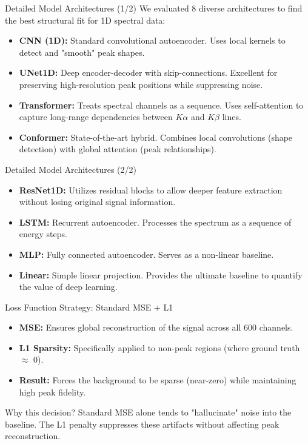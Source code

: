 \begin{frame}{Detailed Model Architectures (1/2)}
    We evaluated 8 diverse architectures to find the best structural fit for 1D spectral data:
    \vspace{0.2cm}
    \begin{itemize}
        \item \textbf{CNN (1D):} Standard convolutional autoencoder. Uses local kernels to detect and "smooth" peak shapes.
        \item \textbf{UNet1D:} Deep encoder-decoder with skip-connections. Excellent for preserving high-resolution peak positions while suppressing noise.
        \item \textbf{Transformer:} Treats spectral channels as a sequence. Uses self-attention to capture long-range dependencies between $K\alpha$ and $K\beta$ lines.
        \item \textbf{Conformer:} State-of-the-art hybrid. Combines local convolutions (shape detection) with global attention (peak relationships).
    \end{itemize}
\end{frame}

\begin{frame}{Detailed Model Architectures (2/2)}
    \begin{itemize}
        \item \textbf{ResNet1D:} Utilizes residual blocks to allow deeper feature extraction without losing original signal information.
        \item \textbf{LSTM:} Recurrent autoencoder. Processes the spectrum as a sequence of energy steps.
        \item \textbf{MLP:} Fully connected autoencoder. Serves as a non-linear baseline.
        \item \textbf{Linear:} Simple linear projection. Provides the ultimate baseline to quantify the value of deep learning.
    \end{itemize}
\end{frame}

\begin{frame}{Loss Function Strategy: Standard MSE + L1}
    \begin{itemize}
        \item \textbf{MSE:} Ensures global reconstruction of the signal across all 600 channels.
        \item \textbf{L1 Sparsity:} Specifically applied to non-peak regions (where ground truth $\approx$ 0).
        \item \textbf{Result:} Forces the background to be sparse (near-zero) while maintaining high peak fidelity.
    \end{itemize}
    \vspace{0.2cm}
    \begin{block}{Why this decision?}
        Standard MSE alone tends to "hallucinate" noise into the baseline. The L1 penalty suppresses these artifacts without affecting peak reconstruction.
    \end{block}
\end{frame}

